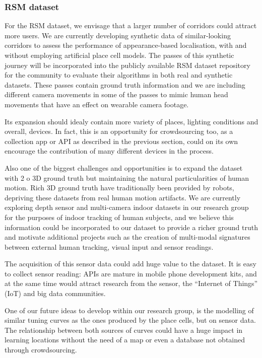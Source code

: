 \subsubsection{RSM dataset}
\label{sec:futureRSM}
For the RSM dataset, we envisage that a larger number of corridors could attract more users. We are currently developing synthetic data of similar-looking corridors to assess the performance of appearance-based localisation, with and without employing artificial place cell models. The passes of this synthetic journey will be incorporated into the publicly available RSM dataset repository for the community to evaluate their algorithms in both real and synthetic datasets. These passes contain ground truth information and we are including different camera movements in some of the passes to mimic human head movements that have an effect on wearable camera footage.

Its expansion should idealy contain more variety of places, lighting conditions and overall, devices. In fact, this is an opportunity for crowdsourcing too, as a collection app or API as described in the previous section, could on its own encourage the contribution of many different devices in the process.

Also one of the biggest challenges and opportunities is to expand the dataset with 2 o 3D ground truth but maintaining the natural particularities of human motion. Rich 3D ground truth have traditionally been provided by robots, depriving these datasets from real human motion artifacts. We are currently exploring depth sensor and multi-camera indoor datasets in our research group for the purposes of indoor tracking of human subjects, and we believe this information could be incorporated to our dataset to provide a richer ground truth and motivate additional projects such as the creation of multi-modal signatures between external human tracking, visual input and sensor readings.

The acquisition of this sensor data could add huge value to the dataset. It is easy to collect sensor reading: APIs are mature in mobile phone development kits, and at the same time would attract research from the sensor, the ``Internet of Things'' (IoT) and big data communities.

One of our future ideas to develop within our research group, is the modelling of similar tuning curves as the ones produced by the place cells, but on sensor data. The relationship between both sources of curves could have a huge impact in learning locations without the need of a map or even a database not obtained through crowdsourcing.

